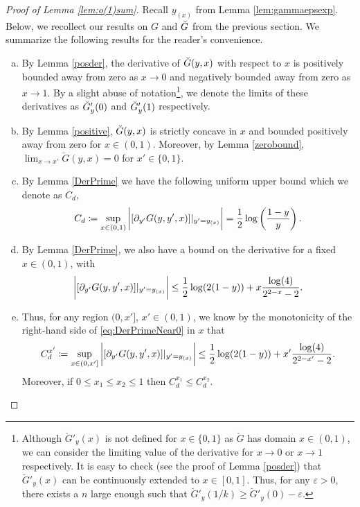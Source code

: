 \documentclass[12pt,reqno]{amsart}
\numberwithin{equation}{section}
\theoremstyle{definition}
\renewcommand{\epsilon}{\varepsilon}
\newcommand{\conv}[1]{\overset{#1}{\rightarrow}}
\renewcommand{\[}{\begin{equation}}
\renewcommand{\]}{\end{equation}}
\renewcommand{\|}{\bigg{|}}
\begin{document}
\begin{proof}[Proof of Lemma \ref{lem:o(1)sum}]

     Recall $y_{(x)}$ from Lemma \ref{lem:gammaepsexp}. Below, we recollect our results on $G$ and $\Breve{G}$ from the previous section. We summarize the following results for the reader's convenience.
    \begin{enumerate}[(a)]
        \item By Lemma \ref{posder}, the derivative of $\Breve{G}(y, x)$ with respect to $x$ is positively bounded away from zero as $x \conv{} 0$ and negatively bounded away from zero as $x \conv{} 1$. By a slight abuse of notation\footnote{Although $\breve{G}'_y(x)$ is not defined for $x \in \{0,1\}$ as $\breve{G}$ has domain $x \in (0,1)$, we can consider the limiting value of the derivative for $x \conv{} 0$ or $x \conv{} 1$ respectively. It is easy to check (see the proof of Lemma \ref{posder}) that $\breve{G}'_y(x)$ can be continuously extended to $x \in [0,1]$. Thus, for any $\epsilon > 0$, there exists a $n$ large enough such that $\breve{G}'_y(1/k) \geq \breve{G}'_y(0) - \epsilon$.}, we denote the limits of these derivatives as $\Breve{G}'_y(0)$ and $\Breve{G}'_y(1)$ respectively. 
        \item By Lemma \ref{positive}, $\Breve{G}(y, x)$ is strictly concave in $x$ and bounded positively away from zero for $x \in (0,1)$. Moreover, by Lemma \ref{zerobound}, $\lim_{x \conv{} x'}\breve{G}(y, x) = 0$ for $x' \in \{0,1\}$.
        \item By Lemma \ref{DerPrime} we have the following uniform upper bound which we denote as $C_d$,
    \[C_d \coloneqq \sup_{x \in (0,1)}\bigg{|}[\partial_{y'}G(y, y', x)]|_{y'=y_{(x)}}\bigg{|} = \frac{1}{2}\log\left(\frac{1-y }{y}\right) \label{eq:unifDerBound}.\]
        \item By Lemma \ref{DerPrime}, we also have a bound on the derivative for a fixed $x \in (0,1)$, with
    \[\bigg{|}[\partial_{y'}G(y, y', x)]|_{y'=y_{(x)}}\bigg{|} \leq \frac{1}{2}\log(2(1-y)) + x\frac{\log(4)}{2^{2-x} - 2}.\label{eq:DerPrimeNear0}\]
        \item Thus, for any region $(0,x']$, $x' \in (0,1)$, we know by the monotonicity of the right-hand side of \eqref{eq:DerPrimeNear0} in $x$ that 
    \[C_d^{x'} \coloneqq \sup_{x \in (0,x']}\bigg{|}[\partial_{y'}G(y, y', x)]|_{y'=y_{(x)}}\bigg{|} \leq \frac{1}{2}\log(2(1-y)) + x'\frac{\log(4)}{2^{2-x'} - 2} \label{eq:unifDerBound0}.\]
    Moreover, if $0\leq x_1 \leq x_2 \leq 1$ then $C_d^{x_1} \leq C_d^{x_2}$.
    \end{enumerate}
    

\end{proof}
\end{document}
